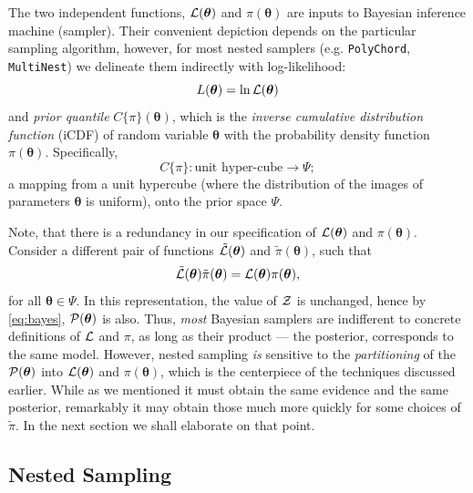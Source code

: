 \documentclass[usenatbib]{mnras}
\begin{document}
The two independent functions, \({\cal L}(\bm{\theta})\) and
\(\pi(\bm{\theta})\) are inputs to Bayesian inference machine
(sampler). Their convenient depiction depends on the particular
sampling algorithm, however, for most nested samplers
(e.g. \texttt{PolyChord}, \texttt{MultiNest}) we delineate them indirectly with
log-likelihood:
\begin{equation*}
  L(\bm{\theta}) = \ln \cal L (\bm{\theta})
\end{equation*}
and \emph{prior quantile} \(C\{\pi\}(\bm{\theta})\), which is the
\emph{inverse cumulative distribution function} (iCDF) of random
variable \(\bm{\theta}\) with the probability density function
\(\pi(\bm{\theta})\). Specifically,
\begin{equation*}
 C\{\pi\} : \text{unit hyper-cube} \rightarrow \Psi;
\end{equation*}
a mapping from a unit hypercube (where the distribution of the images
of parameters \(\bm{\theta}\) is uniform), onto the prior space
\(\Psi\).

Note, that there is a redundancy in our specification of \({\cal
   L}(\bm{\theta})\) and \(\pi(\bm{\theta})\).  Consider a
different pair of functions \(\tilde{{\cal L}}(\bm{\theta})\) and
\(\tilde{\pi}(\bm{\theta})\), such that
\begin{equation}\label{eq:redundancy}
  \tilde{\cal L}(\bm{\theta}) \tilde{\pi}(\bm{\theta}) = \cal L (\bm{\theta}) \pi (\bm{\theta}), 
\end{equation}
for all \(\bm{\theta} \in \Psi\). In this representation, the
value of \({\cal Z}\) is unchanged, hence by \cref{eq:bayes},
\({\cal P}(\bm{\theta})\) is also. Thus, \emph{most} Bayesian samplers
are indifferent to concrete definitions of \(\cal L\) and \(\pi\),
as long as their product --- the posterior, corresponds to the same
model. However, nested sampling \emph{is} sensitive to the
\emph{partitioning} of the \({\cal P} (\bm{\theta})\) into \({\cal L}(\bm{\theta})\)
and \(\pi(\bm{\theta})\), which is the centerpiece of the techniques
discussed earlier. While as we mentioned it must obtain the same
evidence and the same posterior, remarkably it may obtain those
much more quickly for some choices of \(\tilde{\pi}\). In the next
section we shall elaborate on that point.

\subsection{Nested Sampling}\label{sec:org36366f8}
\end{document}
